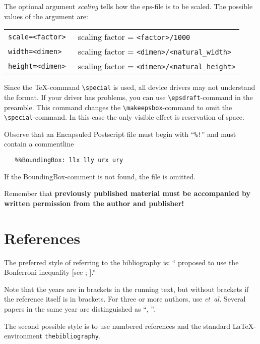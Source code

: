 The optional argument {\em scaling\/} tells
how the eps-file is to be scaled.
The possible values of the argument are:\\
\begin{tabular}{ll}
\tt scale=<factor> &  scaling factor = {\tt<factor>/1000}\\
\tt width=<dimen> & scaling factor = {\tt<dimen>/<natural\_width>} \\
\tt height=<dimen> & scaling factor = {\tt<dimen>/<natural\_height>} 
\end{tabular}

Since the \TeX-command \verb|\special| is used, all device drivers
may not understand the format.
If your driver has problems, you can use \verb|\epsdraft|-com\-mand
in the preamble.
This command changes the \verb|\makeepsbox|-com\-mand
to omit the \verb|\special|-com\-mand.
In this case the only visible effect is reservation of space.

Observe that an Encapsuled Postscript file must begin with
``\verb|%!|'' and must contain a commentline
\begin{verbatim}
   %%BoundingBox: llx lly urx ury
\end{verbatim}
If the BoundingBox-comment is not found, the file is omitted.

Remember that {\bf previously published material must be accompanied by written
permission from the author and publisher!}

\section{References}
The preferred style of referring to the bibliography is:
``\cite{Raatikainen-1993} proposed to use the Bonferroni inequality
[see ;
].''

Note that the
years are in brackets in the running text, but without brackets if the
reference itself is in brackets.
For three or more authors, use {\em et~al.}
Several papers in the same year are distinguished
as ``, ''.

The second possible style is to use numbered references
and the standard \LaTeX-environment \verb|thebibliography|.

